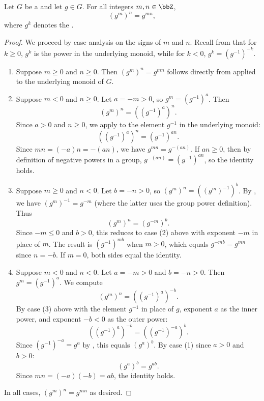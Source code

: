 \begin{lemma} \label{lemma:power_of_power_in_group_for_integer_exponents}
    Let $G$ be a  and let $g \in G$. For all integers $m, n \in \bbZ$,
    $$ (g^m)^n = g^{mn}, $$
    where $g^k$ denotes the .
\end{lemma}

\begin{proof}
    We proceed by case analysis on the signs of $m$ and $n$. Recall from  that for $k \geq 0$, $g^k$ is the power in the underlying monoid, while for $k < 0$, $g^k = (g^{-1})^{-k}$.

    \begin{enumerate}
        \item Suppose $m \geq 0$ and $n \geq 0$. Then $(g^m)^n = g^{mn}$ follows directly from  applied to the underlying monoid of $G$.

        \item Suppose $m < 0$ and $n \geq 0$. Let $a = -m > 0$, so $g^m = (g^{-1})^a$. Then
        $$ (g^m)^n = ((g^{-1})^a)^n. $$
        Since $a > 0$ and $n \geq 0$, we apply  to the element $g^{-1}$ in the underlying monoid:
        $$ ((g^{-1})^a)^n = (g^{-1})^{an}. $$
        Since $mn = (-a)n = -(an)$, we have $g^{mn} = g^{-(an)}$. If $an \geq 0$, then by definition of negative powers in a group, $g^{-(an)} = (g^{-1})^{an}$, so the identity holds.

        \item Suppose $m \geq 0$ and $n < 0$. Let $b = -n > 0$, so $(g^m)^n = ((g^m)^{-1})^b$. By , we have $(g^m)^{-1} = g^{-m}$ (where the latter uses the group power definition). Thus
        $$ (g^m)^n = (g^{-m})^b. $$
        Since $-m \leq 0$ and $b > 0$, this reduces to case (2) above with exponent $-m$ in place of $m$. The result is $(g^{-1})^{mb}$ when $m > 0$, which equals $g^{-mb} = g^{mn}$ since $n = -b$. If $m = 0$, both sides equal the identity.

        \item Suppose $m < 0$ and $n < 0$. Let $a = -m > 0$ and $b = -n > 0$. Then $g^m = (g^{-1})^a$. We compute
        $$ (g^m)^n = ((g^{-1})^a)^{-b}. $$
        By case (3) above with the element $g^{-1}$ in place of $g$, exponent $a$ as the inner power, and exponent $-b < 0$ as the outer power:
        $$ ((g^{-1})^a)^{-b} = ((g^{-1})^{-a})^b. $$
        Since $(g^{-1})^{-a} = g^a$ by , this equals $(g^a)^b$. By case (1) since $a > 0$ and $b > 0$:
        $$ (g^a)^b = g^{ab}. $$
        Since $mn = (-a)(-b) = ab$, the identity holds.
    \end{enumerate}

    In all cases, $(g^m)^n = g^{mn}$ as desired.
\end{proof}
